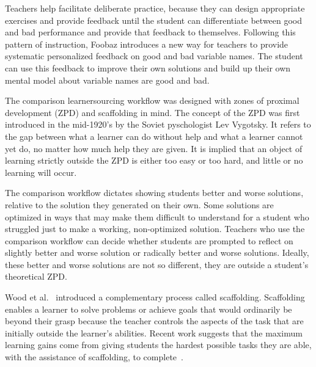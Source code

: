 Teachers help facilitate deliberate practice, because they can design appropriate exercises and provide feedback until the student can differentiate between good and bad performance and provide that feedback to themselves. Following this pattern of instruction, Foobaz introduces a new way for teachers to provide systematic personalized feedback on good and bad variable names. The student can use this feedback to improve their own solutions and build up their own mental model about variable names are good and bad.




The comparison learnersourcing workflow was designed with zones of proximal development (ZPD) and scaffolding in mind. The concept of the ZPD was first introduced in the mid-1920's by the Soviet pyschologist Lev Vygotsky. It refers to the gap between what a learner can do without help and what a learner cannot yet do, no matter how much help they are given. It is implied that an object of learning strictly outside the ZPD is either too easy or too hard, and little or no learning will occur.

The comparison workflow dictates showing students better and worse solutions, relative to the solution they generated on their own. Some solutions are optimized in ways that may make them difficult to understand for a student who struggled just to make a working, non-optimized solution. Teachers who use the comparison workflow can decide whether students are prompted to reflect on slightly better and worse solution or radically better and worse solutions. Ideally, these better and worse solutions are not so different, they are outside a student's theoretical ZPD.

Wood et al.~\cite{woodscaffolding} introduced a complementary process called scaffolding. Scaffolding enables a learner to solve problems or achieve goals that would ordinarily be beyond their grasp because the teacher controls the aspects of the task that are initially outside the learner's abilities. Recent work suggests that the maximum learning gains come from giving students the hardest possible tasks they are able, with the assistance of scaffolding, to complete~\cite{zpd14}. 

